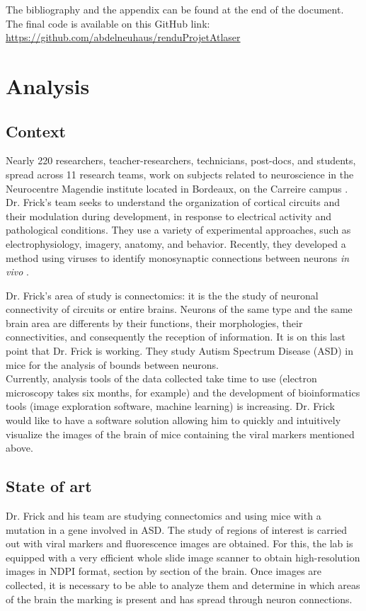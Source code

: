 \documentclass[a4paper,12pt]{report}
\begin{document}
The bibliography and the appendix can be found at the end of the document.\\

The final code is available on this GitHub link: \url{https://github.com/abdelneuhaus/renduProjetAtlaser} \\ 


\chapter{Analysis}{\setcounter{tocdepth}{1}} 
\section{Context}
Nearly 220 researchers, teacher-researchers, technicians, post-docs, and students, spread across 11 research teams, work on subjects related to neuroscience in the Neurocentre Magendie institute located in Bordeaux, on the Carreire campus \cite{instituedescription}.\\

Dr. Frick's team seeks to understand the organization of cortical circuits and their modulation during development, in response to electrical activity and pathological conditions. They use a variety of experimental approaches, such as electrophysiology, imagery, anatomy, and behavior. Recently, they developed a method using viruses to identify monosynaptic connections between neurons \textit{in vivo} \cite{teamdescription} \cite{virusbook}.

Dr. Frick's area of study is connectomics: it is the the study of neuronal connectivity of circuits or entire brains. Neurons of the same type and the same brain area are differents by their functions, their morphologies, their connectivities, and consequently the reception of information. It is on this last point that Dr. Frick is working. They study Autism Spectrum Disease (ASD) in mice for the analysis of bounds between neurons.\\

Currently, analysis tools of the data collected take time to use (electron microscopy takes six months, for example) and the development of bioinformatics tools (image exploration software, machine learning) is increasing. Dr. Frick would like to have a software solution allowing him to quickly and intuitively visualize the images of the brain of mice containing the viral markers mentioned above.\\

\section{State of art}
Dr. Frick and his team are studying connectomics and using mice with a mutation in a gene involved in ASD. The study of regions of interest is carried out with viral markers and fluorescence images are obtained. For this, the lab is equipped with a very efficient whole slide image scanner to obtain high-resolution images in NDPI format, section by section of the brain. Once images are collected, it is necessary to be able to analyze them and determine in which areas of the brain the marking is present and has spread through neuron connections. \\
\end{document}

